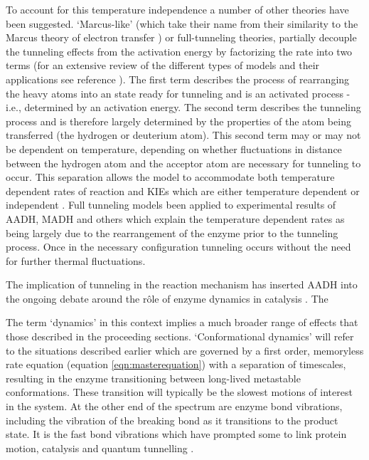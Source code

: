 To account for this temperature independence a number of other theories have been suggested. `Marcus-like' (which take their name from their similarity to the Marcus theory of electron transfer \cite{marcusElectronTransfersChemistry1985}) or full-tunneling theories, partially decouple the tunneling effects from the activation energy by factorizing the rate into two terms \cite{kuznetsovProtonHydrogenAtom1999a, antoniouLargeKineticIsotope1997, knappTemperatureDependentIsotopeEffects2002} (for an extensive review of the different types of models and their applications see reference \cite{puMultidimensionalTunnelingRecrossing2006}). The first term describes the process of rearranging the heavy atoms into an state ready for tunneling and is an activated process - i.e., determined by an activation energy. The second term describes the tunneling process and is therefore  largely determined by the properties of the atom being transferred (the hydrogen or deuterium atom). This second term may or may not be dependent on temperature, depending on whether fluctuations in distance between the hydrogen atom and the acceptor atom are necessary for tunneling to occur. This separation allows the model to accommodate both temperature dependent rates of reaction and KIEs which are either temperature dependent or independent \cite{klinmanHydrogenTunnelingLinks2013}. Full tunneling models been applied to experimental results of AADH, MADH and others \cite{masgrau2004hydrogen, sutcliffeHydrogenTunnellingEnzymecatalysed2006} which explain the temperature dependent rates as being largely due to the rearrangement of the enzyme prior to the tunneling process. Once in the necessary configuration tunneling occurs without the need for further thermal fluctuations.  




The implication of tunneling in the reaction mechanism has inserted AADH into the ongoing debate around the r\^ole of enzyme dynamics in catalysis \cite{klinmanHydrogenTunnelingLinks2013, puMultidimensionalTunnelingRecrossing2006, mcgeaghProteinDynamicsEnzyme2011,glowackiTakingOckhamRazor2012b,glowackiProteinDynamicsEnzyme2012}. The 




The term `dynamics' in this context implies a much broader range of effects that those described in the proceeding sections. `Conformational dynamics' will refer to the situations described earlier which are governed by a first order, memoryless rate equation (equation \ref{eqn:masterequation}) with a separation of timescales, resulting in the enzyme transitioning between long-lived metastable conformations. These transition will typically be the slowest motions of interest in the system. At the other end of the spectrum are enzyme bond vibrations, including the vibration of the breaking bond as it transitions to the product state. It is the fast bond vibrations which have prompted some to link protein motion, catalysis and quantum tunnelling \cite{klinmanHydrogenTunnelingLinks2013, puMultidimensionalTunnelingRecrossing2006, antoniouInternalEnzymeMotions2001}.  






